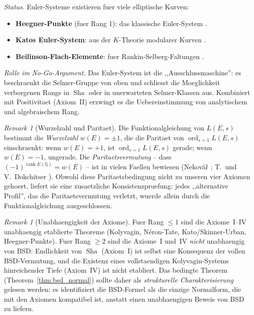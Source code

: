 \documentclass[aps,prd,twocolumn,superscriptaddress,nofootinbib]{revtex4-2}
\theoremstyle{definition}
\theoremstyle{remark}
\newtheorem{remark}[theorem]{Remark}
\DeclareMathOperator{\ord}{ord}
\DeclareMathOperator{\rank}{rank}
\DeclareMathOperator{\Sha}{Sha}
\begin{document}
\textit{Status.} Euler-Systeme existieren fuer viele elliptische Kurven:
\begin{itemize}
\item \textbf{Heegner-Punkte} (fuer Rang 1): das klassische Euler-System \cite{Kolyvagin1990}.
\item \textbf{Katos Euler-System}: aus der $K$-Theorie modularer Kurven \cite{Kato2004}.
\item \textbf{Beilinson-Flach-Elemente}: fuer Rankin-Selberg-Faltungen \cite{LLZ2014}.
\end{itemize}

\textit{Rolle im No-Go-Argument.} Das Euler-System ist die ,,Ausschlussmaschine'': es beschraenkt die Selmer-Gruppe von oben und schliesst die Moeglichkeit verborgenen Rangs in $\Sha$ oder in unerwarteten Selmer-Klassen aus. Kombiniert mit Positivitaet (Axiom~II) erzwingt es die Uebereinstimmung von analytischem und algebraischem Rang.

\begin{remark}[Wurzelzahl und Paritaet]
\label{rem:root_number}
Die Funktionalgleichung von $L(E,s)$ bestimmt die \textit{Wurzelzahl} $w(E) = \pm 1$, die die Paritaet von $\ord_{s=1} L(E,s)$ einschraenkt: wenn $w(E) = +1$, ist $\ord_{s=1} L(E,s)$ gerade; wenn $w(E) = -1$, ungerade. Die \textit{Paritaetsvermutung} -- dass $(-1)^{\rank E(\mathbb{Q})} = w(E)$ -- ist in vielen Faellen bewiesen (Nekov\'a\v{r} \cite{Nekovar2006}; T.~und V.~Dokchitser \cite{Dokchitser2010}). Obwohl diese Paritaetsbedingung nicht zu unseren vier Axiomen gehoert, liefert sie eine zusaetzliche Konsistenzpruefung: jedes ,,alternative Profil'', das die Paritaetsvermutung verletzt, wuerde allein durch die Funktionalgleichung ausgeschlossen.
\end{remark}

\begin{remark}[Unabhaengigkeit der Axiome]
\label{rem:axiom-independence}
Fuer Rang $\leq 1$ sind die Axiome~I--IV unabhaengig etablierte Theoreme (Kolyvagin, N\'eron-Tate, Kato/Skinner-Urban, Heegner-Punkte). Fuer Rang $\geq 2$ sind die Axiome~I und~IV \textit{nicht} unabhaengig von BSD: Endlichkeit von $\Sha$ (Axiom~I) ist selbst eine Konsequenz der vollen BSD-Vermutung, und die Existenz eines vollstaendigen Kolyvagin-Systems hinreichender Tiefe (Axiom~IV) ist nicht etabliert. Das bedingte Theorem (Theorem~\ref{thm:bsd_normal}) sollte daher als \textit{strukturelle Charakterisierung} gelesen werden: es identifiziert die BSD-Formel als die einzige Normalform, die mit den Axiomen kompatibel ist, anstatt einen unabhaengigen Beweis von BSD zu liefern.
\end{remark}
\end{document}
